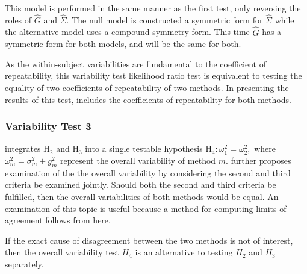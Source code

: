 \documentclass[12pt, a4paper]{report}
\theoremstyle{plain}
\theoremstyle{definition}
\theoremstyle{remark}
\begin{document}
This model is performed in the same manner as the first test, only reversing the roles of ${\hat{G}}$ and ${\hat{\Sigma}}$. The null model is constructed a symmetric form for ${\hat{\Sigma}}$ while the alternative model uses a compound symmetry form. This time ${\hat{G}}$ has a symmetric form for both models, and will be the same for both.
	
As the within-subject variabilities are fundamental to the coefficient of repeatability, this variability test likelihood ratio test is equivalent to testing the equality of two coefficients of repeatability of two methods. In presenting the results of this test, \citet{ARoy2009} includes the coefficients of repeatability for both methods.
	
\subsubsection*{Variability Test 3}
\citet{ARoy2009} integrates $\mathrm{H}_2$ and $\mathrm{H}_3$ into a single testable hypothesis $\mathrm{H}_4\colon \omega^2_1=\omega^2_2,$ where $\omega^2_m = \sigma^2_m + g^2_m$ represent the overall variability of method $m.$ \citet{ARoy2009} further proposes examination of the the overall variability by considering the second and third criteria be examined jointly. Should both the second and third criteria be fulfilled, then the overall variabilities of both methods would be equal. An examination of this topic is useful because a method for computing limits of agreement follows from here.
	

If the exact cause of disagreement between the two methods is not of interest, then the overall variability test $H_4$ is an alternative to testing $H_2$ and $H_3$ separately.
\end{document}
